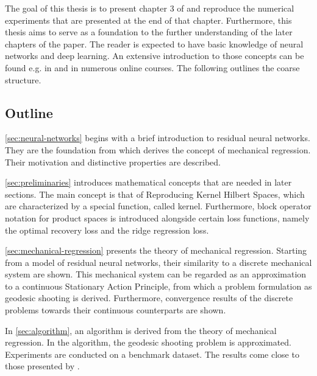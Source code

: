 The goal of this thesis is to present chapter 3 of \cite{owhadi20} and reproduce the numerical experiments that are presented at the end of that chapter.
Furthermore, this thesis aims to serve as a foundation to the further understanding of the later chapters of the paper.
The reader is expected to have basic knowledge of neural networks and deep learning.
An extensive introduction to those concepts can be found e.g. in \cite{goodfellow16} and in numerous online courses.
The following outlines the coarse structure.

\subsection{Outline}

\cref{sec:neural-networks} begins with a brief introduction to residual neural networks.
They are the foundation from which \citet{owhadi20} derives the concept of mechanical regression.
Their motivation and distinctive properties are described.

\cref{sec:preliminaries} introduces mathematical concepts that are needed in later sections.
The main concept is that of Reproducing Kernel Hilbert Spaces, which are characterized by a special function, called kernel.
Furthermore, block operator notation for product spaces is introduced alongside certain loss functions, namely the optimal recovery loss and the ridge regression loss.

\cref{sec:mechanical-regression} presents the theory of mechanical regression.
Starting from a model of residual neural networks, their similarity to a discrete mechanical system are shown.
This mechanical system can be regarded as an approximation to a continuous Stationary Action Principle, from which a problem formulation as geodesic shooting is derived.
Furthermore, convergence results of the discrete problems towards their continuous counterparts are shown.

In \cref{sec:algorithm}, an algorithm is derived from the theory of mechanical regression.
In the algorithm, the geodesic shooting problem is approximated.
Experiments are conducted on a benchmark dataset.
The results come close to those presented by \cite{owhadi20}.
